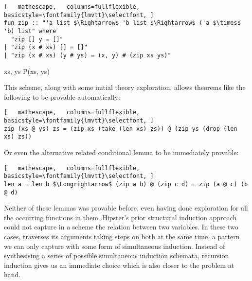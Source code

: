 \begin{lstlisting}[   mathescape,   columns=fullflexible,   basicstyle=\fontfamily{lmvtt}\selectfont, ]
fun zip :: "'a list $\Rightarrow$ 'b list $\Rightarrow$ ('a $\times$ 'b) list" where
  "zip [] y = []"
| "zip (x # xs) [] = []"
| "zip (x # xs) (y # ys) = (x, y) # (zip xs ys)"
\end{lstlisting}

\vspace{2 mm}

  {\forall xs, \; ys \;\; P\;(xs,\; ys)}

\vspace{2 mm}

\noindent This scheme, along with some initial theory exploration, allows theorems like the following to be provable automatically:

\begin{lstlisting}[   mathescape,   columns=fullflexible,   basicstyle=\fontfamily{lmvtt}\selectfont, ]
zip (xs @ ys) zs = (zip xs (take (len xs) zs)) @ (zip ys (drop (len xs) zs))
\end{lstlisting}

\noindent Or even the alternative related conditional lemma to be immediately provable:

\begin{lstlisting}[   mathescape,   columns=fullflexible,   basicstyle=\fontfamily{lmvtt}\selectfont, ]
len a = len b $\Longrightarrow$ (zip a b) @ (zip c d) = zip (a @ c) (b @ d)
\end{lstlisting}

Neither of these lemmas was provable before, even having done exploration for all the occurring functions in them.
%
Hipster's prior structural induction approach could not capture in a scheme the relation between two variables.
%
In these two cases,  traverses its arguments taking steps on both at the same time, a pattern we can only capture with some form of simultaneous induction.
%
Instead of synthesising a series of possible simultaneous induction schemata, recursion induction gives us an immediate choice which is also closer to the problem at hand.







